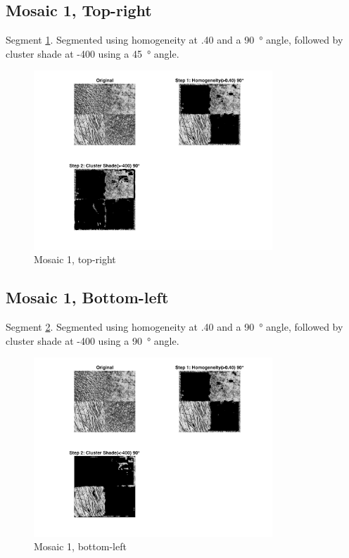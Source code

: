 \documentclass[a4paper,12pt,titlepage]{article}
\begin{document}
\subsection*{Mosaic 1, Top-right} 
Segment \ref{fig:Mosaic1SegmentedTopRight}. Segmented using homogeneity at .40 and a \SI{90}{\degree} angle, followed by cluster shade at -400 using a \SI{45}{\degree} angle.

\begin{figure}[H]
	\includegraphics[width=0.8\textwidth]{partD-mosaic1-segmentation-top-right}
	\caption{Mosaic 1, top-right}
	\label{fig:Mosaic1SegmentedTopRight}
\end{figure}

\subsection*{Mosaic 1, Bottom-left} 
Segment \ref{fig:Mosaic1SegmentedBottomLeft}. Segmented using homogeneity at .40 and a \SI{90}{\degree} angle, followed by cluster shade at -400 using a \SI{90}{\degree} angle.

\begin{figure}[H]
	\includegraphics[width=0.8\textwidth]{partD-mosaic1-segmentation-bottom-left}
	\caption{Mosaic 1, bottom-left}
	\label{fig:Mosaic1SegmentedBottomLeft}
\end{figure}
\end{document}
